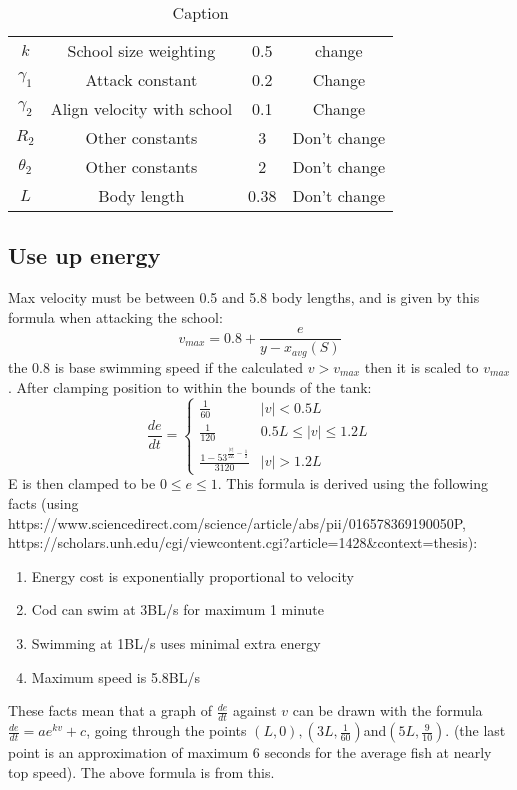 \begin{table}
    \centering
    \begin{tabular}{cccc}
         $k$&  School size weighting&  0.5& change\\
         $\gamma_1$&  Attack constant&  0.2& Change\\
         $\gamma_2$&  Align velocity with school&  0.1& Change\\
         $R_2$&  Other constants&  3& Don't change\\
         $\theta_2$&  Other constants&  2& Don't change\\
 $L$& Body length& 0.38&Don't change\\
    \end{tabular}
    \caption{Caption}
    \label{tab:a}
\end{table}
\subsection{Use up energy}
Max velocity must be between 0.5 and 5.8 body lengths, and is given by this formula when attacking the school:
\begin{equation}
    v_{max} = 0.8+\frac{e}{y-x_{avg}(S)}
\end{equation}
the 0.8 is base swimming speed
if the calculated $v>v_{max}$ then it is scaled to $v_{max}$. After clamping position to within the bounds of the tank:
\begin{equation}
    \frac{de}{dt} = \begin{cases}
    \frac{1}{60}&|v|<0.5L\\
    \frac{1}{120}&0.5L\le|v|\le1.2L\\
    \frac{1-53^{\frac{|v|}{2L}-\frac{1}{2}}}{3120}&|v|>1.2L
    \end{cases}
\end{equation}
E is then clamped to be $0\le e \le1$.
This formula is derived using the following facts (using https://www.sciencedirect.com/science/article/abs/pii/016578369190050P, \\
https://scholars.unh.edu/cgi/viewcontent.cgi?article=1428\&context=thesis):
\begin{enumerate}
    \item Energy cost is exponentially proportional to velocity
    \item Cod can swim at 3BL/s for maximum 1 minute
    \item Swimming at 1BL/s uses minimal extra energy
    \item Maximum speed is 5.8BL/s
\end{enumerate}
These facts mean that a graph of $\frac{de}{dt}$ against $v$ can be drawn with the formula $\frac{de}{dt}=ae^{kv}+c$, going through the points $\left(L, 0\right),\left(3L,\frac{1}{60}\right)$and$\left(5L,\frac{9}{10}\right)$. (the last point is an approximation of maximum 6 seconds for the average fish at nearly top speed). The above formula is from this.

